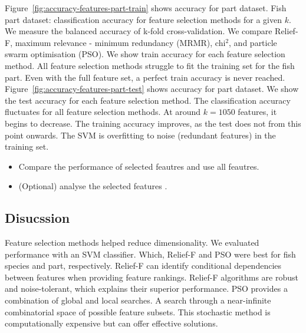 \documentclass[runningheads]{llncs}
\begin{document}
Figure~\ref{fig:accuracy-features-part-train} shows accuracy for part dataset.
Fish part dataset: classification accuracy for feature selection methods for a given $k$.
We measure the balanced accuracy of k-fold cross-validation.
We compare Relief-F, maximum relevance - minimum redundancy (MRMR), chi$^2$, and particle swarm optimisation (PSO).
We show train accuracy for each feature selection method.
All feature selection methods struggle to fit the training set for the fish part.
Even with the full feature set, a perfect train accuracy is never reached.
Figure~\ref{fig:accuracy-features-part-test} shows accuracy for part dataset.
We show the test accuracy for each feature selection method.
The classification accuracy fluctuates for all feature selection methods.
At around $k=1050$ features, it begins to decrease.
The training accuracy improves, as the test does not from this point onwards.
The SVM is overfitting to noise (redundant features) in the training set.


\begin{itemize}
  \item Compare the performance of selected feautres and use all feautres. 
  \item (Optional) analyse the selected features .
\end{itemize}


\subsection{Disucssion}
\label{sec:results-feature-selection-discussion}


Feature selection methods helped reduce dimensionality.
We evaluated performance with an SVM classifier.
Which, Relief-F and PSO were best for fish species and part, respectively.
Relief-F can identify conditional dependencies between features when providing feature rankings.
Relief-F algorithms are robust and noise-tolerant, which explains their superior performance.
PSO provides a combination of global and local searches.
A search through a near-infinite combinatorial space of possible feature subsets.
This stochastic method is computationally expensive but can offer effective solutions.
\end{document}

